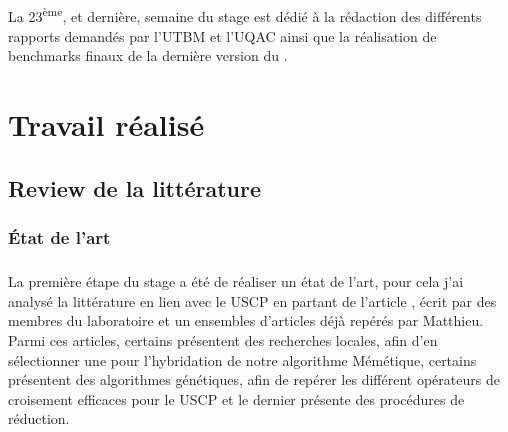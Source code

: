 \documentclass[a4paper,11pt,twoside,french,report]{../common/simplem}
\begin{document}
				\paragraph*{}
					La 23\textsuperscript{ème}, et dernière, semaine du stage est dédié à la rédaction des différents rapports demandés par l'\gls{UTBM} et l'\gls{UQAC} ainsi que la réalisation de benchmarks finaux de la dernière version du \solver{}.
	\chapter{Travail réalisé}\label{sec:work}
		\section{Review de la littérature}\label{sec:review_litterature}
			\subsection{État de l'art}
				\paragraph*{}
					La première étape du stage a été de réaliser un état de l'art, pour cela j'ai analysé la littérature en lien avec le \gls{USCP} en partant de l'article , écrit par des membres du laboratoire et un ensembles d'articles déjà repérés par Matthieu. Parmi ces articles, certains présentent des recherches locales, afin d'en sélectionner une pour l'hybridation de notre algorithme Mémétique, certains présentent des algorithmes génétiques, afin de repérer les différent opérateurs de croisement efficaces pour le \gls{USCP} et le dernier présente des procédures de réduction.
\end{document}
